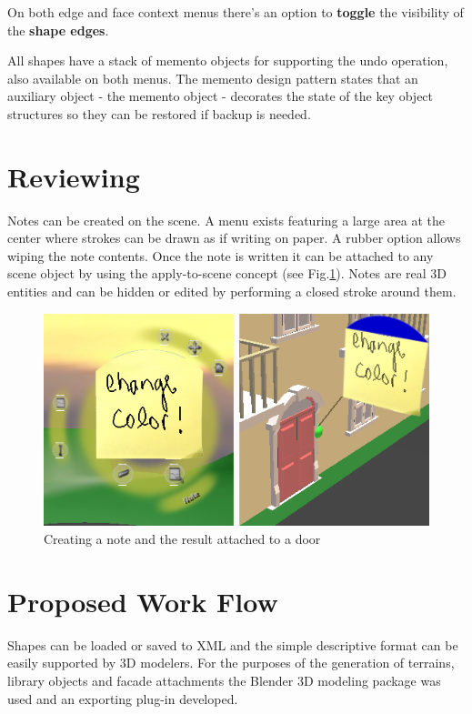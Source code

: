 On both edge and face context menus there's an option to \textbf{toggle} the visibility of the \textbf{shape edges}.

All shapes have a stack of memento objects for supporting the undo operation, also available on both menus.
The memento design pattern states that an auxiliary object - the memento object - decorates the state of the key object structures so they
can be restored if backup is needed.


\section{Reviewing}

Notes can be created on the scene. A menu exists featuring a large area at the center where strokes can be drawn as if writing on paper.
A rubber option allows wiping the note contents. Once the note is written it can be attached to any scene object by using the
apply-to-scene concept (see Fig.\ref{fig:note}).
Notes are real 3D entities and can be hidden or edited by performing a closed stroke around them.

\begin{figure}[ht]
	\centering
		\includegraphics[scale=0.5]{gfx/note.png}
	\caption{Creating a note and the result attached to a door}
	\label{fig:note}
\end{figure}


\section{Proposed Work Flow}

Shapes can be loaded or saved to XML and the simple descriptive format can be easily supported by 3D modelers.
For the purposes of the generation of terrains, library objects and facade attachments the Blender 3D modeling package
was used and an exporting plug-in developed.

